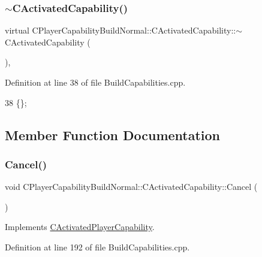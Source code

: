 \subsubsection{\texorpdfstring{$\sim$\+C\+Activated\+Capability()}{~CActivatedCapability()}}
{\footnotesize\ttfamily virtual C\+Player\+Capability\+Build\+Normal\+::\+C\+Activated\+Capability\+::$\sim$\+C\+Activated\+Capability (\begin{DoxyParamCaption}{ }\end{DoxyParamCaption})\hspace{0.3cm}{\ttfamily [inline]}, {\ttfamily [virtual]}}



Definition at line 38 of file Build\+Capabilities.\+cpp.


\begin{DoxyCode}
38 \{\};
\end{DoxyCode}


\subsection{Member Function Documentation}
\hypertarget{classCPlayerCapabilityBuildNormal_1_1CActivatedCapability_a7cc74f98f4071edfa75395d02d897fef}{}\label{classCPlayerCapabilityBuildNormal_1_1CActivatedCapability_a7cc74f98f4071edfa75395d02d897fef} 
\subsubsection{\texorpdfstring{Cancel()}{Cancel()}}
{\footnotesize\ttfamily void C\+Player\+Capability\+Build\+Normal\+::\+C\+Activated\+Capability\+::\+Cancel (\begin{DoxyParamCaption}{ }\end{DoxyParamCaption})\hspace{0.3cm}{\ttfamily [virtual]}}



Implements \hyperlink{classCActivatedPlayerCapability_a5cde83be468e262ad054d81e28684a81}{C\+Activated\+Player\+Capability}.



Definition at line 192 of file Build\+Capabilities.\+cpp.



